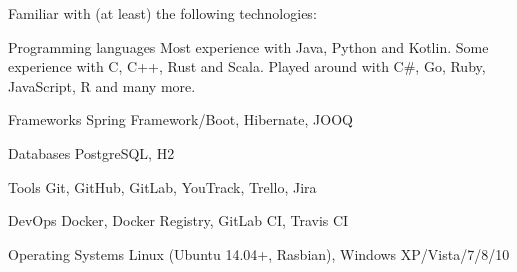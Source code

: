 
Familiar with (at least) the following technologies:
\begin{cvskills}

\cvskill
{Programming languages} 
{Most experience with Java, Python and Kotlin. Some experience with C, C++, Rust and Scala.} 
\cvskill
{} 
{Played around with C\#, Go, Ruby, JavaScript, R and many more.} 

\cvskill
{Frameworks} %
{Spring Framework/Boot, Hibernate, JOOQ} %

\cvskill
{Databases} %
{PostgreSQL, H2} %

\cvskill
{Tools} %
{Git, GitHub, GitLab, YouTrack, Trello, Jira} %

\cvskill
{DevOps} %
{Docker, Docker Registry, GitLab CI, Travis CI}

\cvskill
{Operating Systems}
{Linux (Ubuntu 14.04+, Rasbian), Windows XP/Vista/7/8/10}


\end{cvskills}
